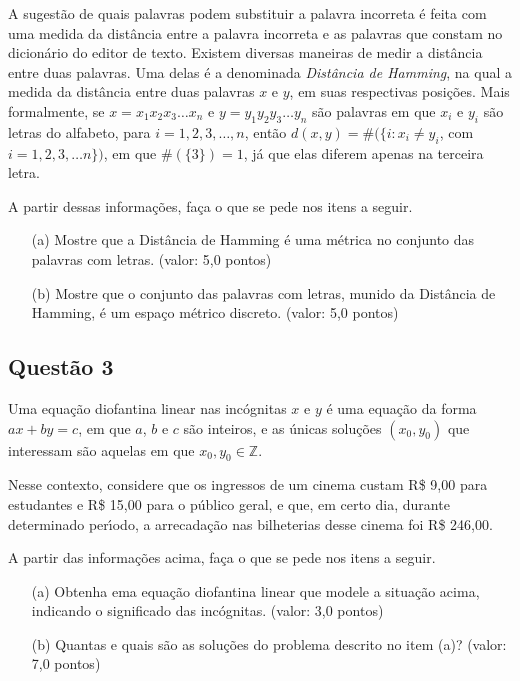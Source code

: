 \documentclass{report}
\begin{document}
A sugest\~ao de quais palavras podem substituir a palavra incorreta \'e feita com uma medida da dist\^ancia entre a palavra incorreta e as palavras que constam no dicion\'ario do editor de texto. Existem diversas maneiras de medir a dist\^ancia entre duas palavras. Uma delas \'e a denominada {\it Dist\^ancia de Hamming}, na qual a medida da dist\^ancia entre duas palavras $x$ e $y$, em suas respectivas posi\c c\~oes. Mais formalmente, se $x=x_1x_2x_3\ldots x_n$ e $y=y_1y_2y_3\ldots y_n$ s\~ao palavras em que $x_i$ e $y_i$ s\~ao letras do alfabeto, para $i=1,2,3,\ldots,n$, ent\~ao $d(x,y)=\#(\{i:x_i\neq y_i$, com $i=1,2,3,\ldots n\})$, em que $\#(\{3\})=1$, j\'a que elas diferem apenas na terceira letra.

A partir dessas informa\c c\~oes, fa\c ca o que se pede nos itens a seguir.

\begin{enumerate}

\item[(a)] Mostre que a Dist\^ancia de Hamming \'e uma m\'etrica no conjunto das palavras com letras. (valor: 5,0 pontos)

\item[(b)] Mostre que o conjunto das palavras com letras, munido da Dist\^ancia de Hamming, \'e um espa\c co m\'etrico discreto. (valor: 5,0 pontos)

\end{enumerate}

\subsection{\color{blue} Quest\~ao 3}

Uma equa\c c\~ao diofantina linear nas inc\'ognitas $x$ e $y$ \'e uma equa\c c\~ao da forma $ax+by=c$, em que $a$, $b$ e $c$ s\~ao inteiros, e as \'unicas solu\c c\~oes $(x_0,y_0)$ que interessam s\~ao aquelas em que $x_0, y_0 \in \mathbb Z$.

Nesse contexto, considere que os ingressos de um cinema custam R\$ 9,00 para estudantes e R\$ 15,00 para o p\'ublico geral, e que, em certo dia, durante determinado per\'\i odo, a arrecada\c c\~ao nas bilheterias desse cinema foi R\$ 246,00.

A partir das informa\c c\~oes acima, fa\c ca o que se pede nos itens a seguir.

\begin{enumerate}

\item[(a)] Obtenha ema equa\c c\~ao diofantina linear que modele a situa\c c\~ao acima, indicando o significado das inc\'ognitas. (valor: 3,0 pontos)

\item[(b)] Quantas e quais s\~ao as solu\c c\~oes do problema descrito no item (a)? (valor: 7,0 pontos)

\end{enumerate}
\end{document}
